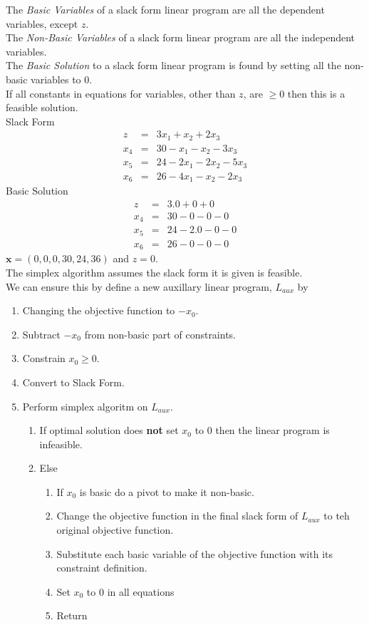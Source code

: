 \documentclass[11pt,a4paper]{article}
\begin{document}
The \textit{Basic Variables} of a slack form linear program are all the dependent variables, except $z$.\\
The \textit{Non-Basic Variables} of a slack form linear program are all the independent variables.\\

The \textit{Basic Solution} to a slack form linear program is found by setting all the non-basic variables to $0$.\\
If all constants in equations for variables, other than $z$, are $\geq0$ then this is a feasible solution.\\

Slack Form
\[\begin{array}{rcl}
z&=&3x_1+x_2+2x_3\\
x_4&=&30-x_1-x_2-3x_3\\
x_5&=&24-2x_1-2x_2-5x_3\\
x_6&=&26-4x_1-x_2-2x_3
\end{array}\]
Basic Solution\\
\[\begin{array}{rcl}
z&=&3.0+0+0\\
x_4&=&30-0-0-0\\
x_5&=&24-2.0-0-0\\
x_6&=&26-0-0-0
\end{array}\]
$\textbf{x}=(0,0,0,30,24,36)$ and $z=0$.\\

The simplex algorithm assumes the slack form it is given is feasible.\\
We can ensure this by define a new auxillary linear program, $L_{aux}$ by
\begin{enumerate}
	\item Changing the objective function to $-x_0$.
	\item Subtract $-x_0$ from non-basic part of constraints.
	\item Constrain $x_0\geq0$.
	\item Convert to Slack Form.
	\item Perform simplex algoritm on $L_{aux}$.
	\begin{enumerate}
		\item If optimal solution does \textbf{not} set $x_0$ to 0 then the linear program is infeasible.
		\item Else
		\begin{enumerate}
			\item If $x_0$ is basic do a pivot to make it non-basic.
			\item Change the objective function in the final slack form of $L_{aux}$ to teh original objective function.
			\item Substitute each basic variable of the objective function with its constraint definition.
			\item Set $x_0$ to 0 in all equations
			\item Return
		\end{enumerate}
	\end{enumerate}
\end{enumerate}
\end{document}
